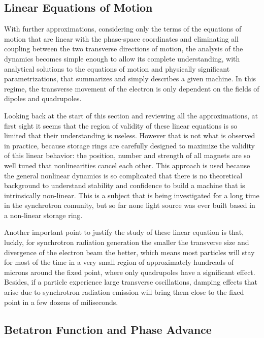 \subsection{Linear Equations of Motion}

	With further approximations, considering only the terms of the equations of motion that are linear with the phase-space coordinates and eliminating all coupling between the two transverse directions of motion, the analysis of the dynamics becomes simple enough to allow its complete understanding, with analytical solutions to the equations of motion and physically significant parametrizations, that summarizes and simply describes a given machine. In this regime, the transverse movement of the electron is only dependent on the fields of dipoles and quadrupoles.

	Looking back at the start of this section and reviewing all the approximations, at first sight it seems that the region of validity of these linear equations is so limited that their understanding is useless. However that is not what is observed in practice, because storage rings are carefully designed to maximize the validity of this linear behavior: the position, number and strength of all magnets are so well tuned that nonlinearities cancel each other. This approach is used because the general nonlinear dynamics is so complicated that there is no theoretical background to understand stability and confidence to build a machine that is intrinsically non-linear. This is a subject that is being investigated for a long time in the synchrotron comunity, but so far none light source was ever built based in a non-linear storage ring.

	Another important point to justify the study of these linear equation is that, luckly, for synchrotron radiation generation the smaller the transverse size and divergence of the electron beam the better, which means most particles will stay for most of the time in a very small region of approximately hundreads of microns around the fixed point, where only quadrupoles have a significant effect. Besides, if a particle experience large transverse oscillations, damping effects that arise due to synchrotron radiation emission will bring them close to the fixed point in a few dozens of miliseconds.

\subsection{Betatron Function and Phase Advance} \label{ssub:betatron_function}

